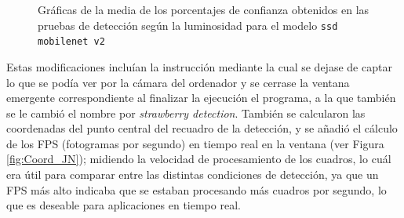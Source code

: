   \begin{figure}[H]
    \begin{center}
      \subcapcentertrue
      \hspace{4mm}
    \end{center}
    \caption{Gráficas de la media de los porcentajes de confianza obtenidos en las pruebas de detección según la luminosidad para el modelo \texttt{ssd mobilenet v2}}
    \label{fig:Grafica_medias_luminosidad}
  \end{figure}

Estas modificaciones incluían la instrucción mediante la cual se dejase de captar lo que se podía ver por la cámara del ordenador y se cerrase la ventana emergente correspondiente al finalizar la ejecución el programa, a la que también se le cambió el nombre por \textit{strawberry detection}. También se calcularon las coordenadas del punto central del recuadro de la detección, y se añadió el cálculo de los FPS (fotogramas por segundo) en tiempo real en la ventana (ver Figura \ref{fig:Coord_JN}); midiendo la velocidad de procesamiento de los cuadros, lo cuál era útil para comparar entre las distintas condiciones de detección, ya que un FPS más alto indicaba que se estaban procesando más cuadros por segundo, lo que es deseable para aplicaciones en tiempo real.

